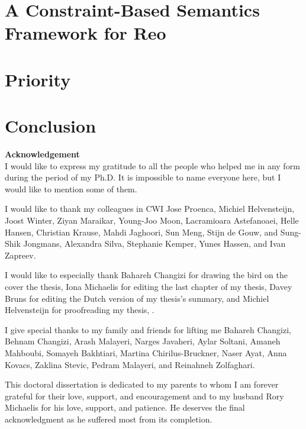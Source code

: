 \documentclass[runnngheads]{book}
\begin{document}
\chapter{A Constraint-Based Semantics Framework for Reo}
\label{chapterCASM}

\chapter{Priority}
\label{ch:prio}

\chapter{Conclusion}
\label{ch:concl}
\singlespacing

\clearpage


\newpage


\newpage
{\textbf{\Large{Acknowledgement}}}
\vspace*{1cm}
\\
I would like to express my gratitude to all the people who helped me in any form during the period of my Ph.D. It is impossible to name everyone here, but I would like to mention some of them.

I would like to thank my colleagues in CWI Jose Proenca, Michiel Helvensteijn, Joost Winter, Ziyan Maraikar, Young-Joo Moon, Lacramioara Astefanoaei, Helle Hansen, Christian Krause, Mahdi Jaghoori, Sun Meng, Stijn de Gouw, and Sung-Shik Jongmans, Alexandra Silva, Stephanie Kemper, Yunes Hassen, and Ivan Zapreev.

I would like to especially thank Bahareh Changizi for drawing the bird on the  cover the thesis, Iona Michaelis for editing the last chapter of my thesis, Davey Bruns for editing the Dutch version of my thesis's summary, and Michiel Helvensteijn for proofreading my thesis, .

I give special thanks to my family and friends for lifting me Bahareh Changizi,  Behnam Changizi, Arash Malayeri, Narges Javaheri, Aylar Soltani, Amaneh Mahboubi, Somayeh Bakhtiari, Martina Chirilus-Bruckner, Naser Ayat, Anna Kovacs, Zaklina Stevic, Pedram Malayeri, and Reinahneh Zolfaghari.

This doctoral dissertation is dedicated to my parents to whom I am forever grateful for their love, support, and encouragement and to my husband Rory Michaelis for his love, support, and patience. He
deserves the final acknowledgment as he suffered most from its completion.
\end{document}
